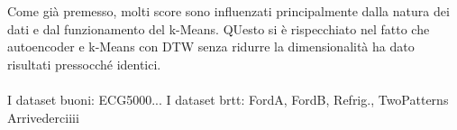 Come già premesso, molti score sono influenzati principalmente dalla natura dei dati e dal funzionamento del k-Means. QUesto si è rispecchiato nel fatto che autoencoder e k-Means con DTW senza ridurre la dimensionalità ha dato risultati pressocché identici.\\
\\
I dataset buoni: ECG5000...
I dataset brtt: FordA, FordB, Refrig., TwoPatterns
Arrivederciiii